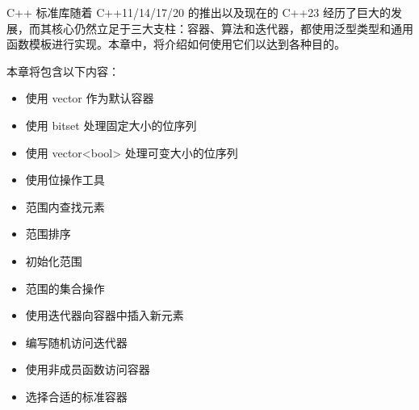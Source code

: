 C++ 标准库随着 C++11/14/17/20 的推出以及现在的 C++23 经历了巨大的发展，而其核心仍然立足于三大支柱：容器、算法和迭代器，都使用泛型类型和通用函数模板进行实现。本章中，将介绍如何使用它们以达到各种目的。

本章将包含以下内容：

\begin{itemize}
\item
使用 vector 作为默认容器

\item
使用 bitset 处理固定大小的位序列

\item
使用 vector<bool> 处理可变大小的位序列

\item
使用位操作工具

\item
范围内查找元素

\item
范围排序

\item
初始化范围

\item
范围的集合操作

\item
使用迭代器向容器中插入新元素

\item
编写随机访问迭代器

\item
使用非成员函数访问容器

\item
选择合适的标准容器
\end{itemize}
